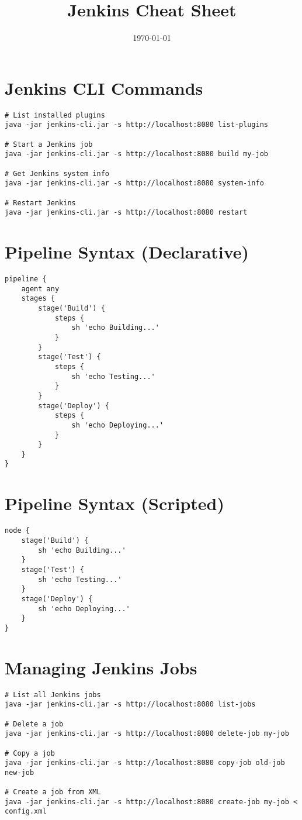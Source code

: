 \documentclass[11pt]{article}
\title{\textbf{Jenkins Cheat Sheet}}
\author{}
\date{\today}
\begin{document}
    \maketitle

    \section*{Jenkins CLI Commands}
    \begin{lstlisting}[style=jenkinsStyle]
# List installed plugins
java -jar jenkins-cli.jar -s http://localhost:8080 list-plugins

# Start a Jenkins job
java -jar jenkins-cli.jar -s http://localhost:8080 build my-job

# Get Jenkins system info
java -jar jenkins-cli.jar -s http://localhost:8080 system-info

# Restart Jenkins
java -jar jenkins-cli.jar -s http://localhost:8080 restart
    \end{lstlisting}

    \section*{Pipeline Syntax (Declarative)}
    \begin{lstlisting}[style=jenkinsStyle]
pipeline {
    agent any
    stages {
        stage('Build') {
            steps {
                sh 'echo Building...'
            }
        }
        stage('Test') {
            steps {
                sh 'echo Testing...'
            }
        }
        stage('Deploy') {
            steps {
                sh 'echo Deploying...'
            }
        }
    }
}
    \end{lstlisting}

    \section*{Pipeline Syntax (Scripted)}
    \begin{lstlisting}[style=jenkinsStyle]
node {
    stage('Build') {
        sh 'echo Building...'
    }
    stage('Test') {
        sh 'echo Testing...'
    }
    stage('Deploy') {
        sh 'echo Deploying...'
    }
}
    \end{lstlisting}

    \section*{Managing Jenkins Jobs}
    \begin{lstlisting}[style=jenkinsStyle]
# List all Jenkins jobs
java -jar jenkins-cli.jar -s http://localhost:8080 list-jobs

# Delete a job
java -jar jenkins-cli.jar -s http://localhost:8080 delete-job my-job

# Copy a job
java -jar jenkins-cli.jar -s http://localhost:8080 copy-job old-job new-job

# Create a job from XML
java -jar jenkins-cli.jar -s http://localhost:8080 create-job my-job < config.xml
    \end{lstlisting}
\end{document}
